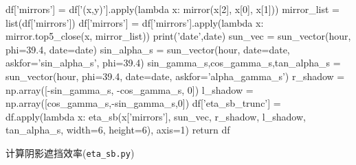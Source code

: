 \documentclass{article}
\numberwithin{equation}{subsection}
\begin{document}
\begin{python}
    df['mirrors'] = df['(x,y)'].apply(lambda x: mirror(x[2], x[0], x[1]))
    mirror_list = list(df['mirrors'])
    df['mirrors'] = df['mirrors'].apply(lambda x: mirror.top5_close(x, mirror_list))
    print('date',date)
    sun_vec = sun_vector(hour, phi=39.4, date=date)
    sin_alpha_s = sun_vector(hour, date=date, askfor='sin_alpha_s', phi=39.4)
    sin_gamma_s,cos_gamma_s,tan_alpha_s = sun_vector(hour, phi=39.4, date=date, askfor='alpha_gamma_s')
    r_shadow = np.array([-sin_gamma_s, -cos_gamma_s, 0])
    l_shadow = np.array([cos_gamma_s,-sin_gamma_s,0])
    df['eta_sb_trunc'] = df.apply(lambda x: eta_sb(x['mirrors'], sun_vec, r_shadow, l_shadow, tan_alpha_s, width=6, height=6), axis=1)
    return df


\end{python}

计算阴影遮挡效率(\verb|eta_sb.py|)
\end{document}
